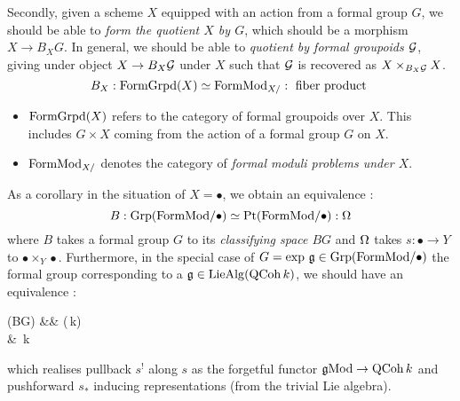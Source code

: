 \documentclass[./main.tex]{subfiles}
\begin{document}
Secondly, given a scheme $X$ equipped with an action from a formal group $G$,
we should be able to \emph{form the quotient $X$ by $G$},
which should be a morphism $X \to B_XG$.
In general, we should be able to \emph{quotient by formal groupoids $\mathcal{G}$},
giving under object $X \to B_X \mathcal{G}$ under $X$ such that
$\mathcal{G}$ is recovered as $X \times_{B_X \mathcal{G}} X$.
\cite[Ch 5 , 2.3.2]{GR2}
\[
  B_X : \mathrm{FormGrpd}(X) \simeq \mathrm{FormMod}_{X /} : \text{ fiber product }
\]
\begin{itemize}
  \item $\mathrm{FormGrpd}(X)$ refers to the category of formal groupoids over $X$.
  This includes $G \times X$ coming from the action of
  a formal group $G$ on $X$. \cite[Ch 5, 2.2.1]{GR2}
  \item $\mathrm{FormMod}_{X /}$ denotes the category of 
  \emph{formal moduli problems under $X$}. \cite[Ch 5, 1.3]{GR2}
\end{itemize}
As a corollary in the situation of $X = \bullet$,
we obtain an equivalence : 
\[
  B : \mathrm{Grp}(\mathrm{FormMod} / \bullet) \simeq \mathrm{Pt}(\mathrm{FormMod} / \bullet) : \Omega
\]
where $B$ takes a formal group $G$ to its \emph{classifying space $BG$}
and $\Omega$ takes $s : \bullet \to Y$ to $\bullet \times_Y \bullet$.
Furthermore,
in the special case of $G = \exp\,\mathfrak{g} \in \mathrm{Grp}(\mathrm{FormMod} / \bullet)$
the formal group corresponding to a $\mathfrak{g} \in \mathrm{Lie}\mathrm{Alg}(\mathrm{QCoh}\,k)$,
we should have an equivalence : 
\begin{cd}
  {\QCOH(BG)} && {\MOD(\QCOH\,k)} \\
	& {\QCOH\,k}
	\arrow["\sim", from=1-1, to=1-3]
	\arrow["{s^!}", shift left=3, from=1-1, to=2-2, shorten <=9pt]
	\arrow["{s_*}", shift left=2, from=2-2, to=1-1]
	\arrow["\top"{marking}, draw=none, from=2-2, to=1-1]
	\arrow["{\text{ind}}"{pos=0.3}, shift left=2, shorten >=10pt, from=2-2, to=1-3]
	\arrow["{\text{forget}}", shift left=2, shorten >=3pt, from=1-3, to=2-2]
	\arrow["\bot"{marking}, draw=none, from=2-2, to=1-3]
\end{cd}
which realises pullback $s^!$ along $s$ as the forgetful functor
$\mathfrak{g}\mathrm{Mod} \to \mathrm{QCoh}\,k$ and pushforward $s_*$ inducing representations
(from the trivial Lie algebra).
\end{document}
